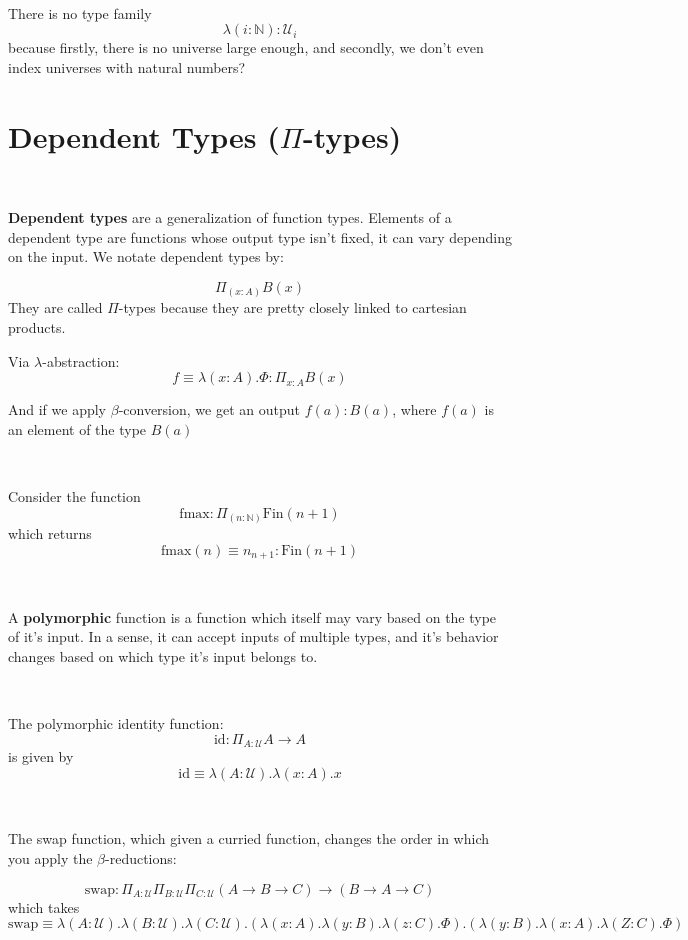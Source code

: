 \documentclass{article}
\begin{document}
\begin{example}
\

There is no type family $$\lambda(i:\mathbb{N}): \mathcal{U}_i$$because firstly, there is no universe large enough, and secondly, we don't even index universes with natural numbers?
\end{example}

\section{Dependent Types ($\Pi$-types)}

\begin{definition}
\

\textbf{Dependent types} are a generalization of function types. Elements of a dependent type are functions whose output type isn't fixed, it can vary depending on the input. We notate dependent types by:

$$\Pi_{(x:A)} B(x)$$They are called $\Pi$-types because they are pretty closely linked to cartesian products.

Via $\lambda$-abstraction: $$f \equiv \lambda (x:A).\Phi: \Pi_{x:A} B(x)$$

And if we apply $\beta$-conversion, we get an output $f(a) : B(a)$, where $f(a)$ is an element of the type $B(a)$
\end{definition}

\begin{example}
\

Consider the function $$\text{fmax} : \Pi_{(n : \mathbb{N})} \text{Fin}(n+1)$$which returns $$\text{fmax}(n) \equiv n_{n+1} : \text{Fin}(n+1)$$
\end{example}

\begin{definition}
\

A \textbf{polymorphic} function is a function which itself may vary based on the type of it's input. In a sense, it can accept inputs of multiple types, and it's behavior changes based on which type it's input belongs to. 
\end{definition}

\begin{example}
\

The polymorphic identity function: $$\text{id}: \Pi_{A : \mathcal{U}} A \to A$$is given by $$\text{id} \equiv \lambda (A: \mathcal{U}). \lambda (x:A).x$$
\end{example}

\begin{example}
\

The swap function, which given a curried function, changes the order in which you apply the $\beta$-reductions:

$$\text{swap}: \Pi_{A : \mathcal{U}} \Pi_{B: \mathcal{U}} \Pi_{C: \mathcal{U}} (A \to B \to C) \to (B \to A \to C)$$which takes $$\text{swap} \equiv \lambda(A : \mathcal{U}).\lambda(B: \mathcal{U}).\lambda (C: \mathcal{U}).(\lambda(x:A).\lambda(y:B).\lambda(z:C).\Phi).(\lambda(y:B).\lambda(x:A).\lambda(Z:C).\Phi)$$
\end{example}
\end{document}
